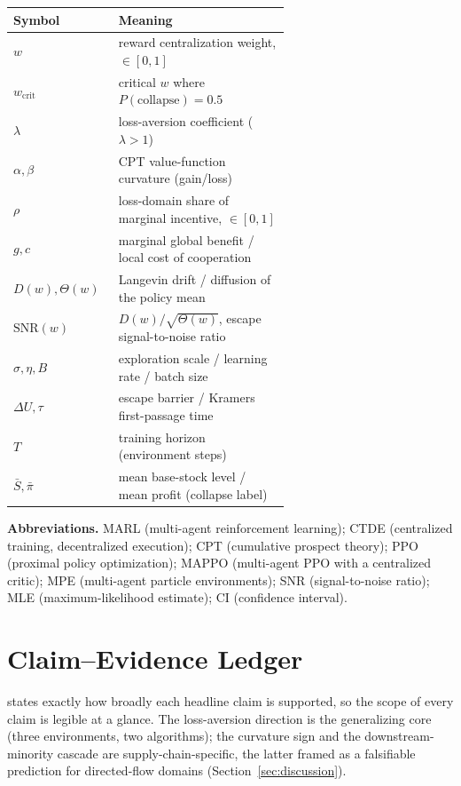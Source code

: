 \documentclass[letterpaper]{article}
\theoremstyle{plain}
\newcommand{\wcrit}{w_{\mathrm{crit}}}
\begin{document}
\begin{table}[h]
\centering
\small
\begin{tabular}{lp{0.62\linewidth}}
\toprule
Symbol & Meaning \\
\midrule
$w$ & reward centralization weight, $\in[0,1]$ \\
$\wcrit$ & critical $w$ where $P(\mathrm{collapse}){=}0.5$ \\
$\lambda$ & loss-aversion coefficient ($\lambda{>}1$) \\
$\alpha,\beta$ & CPT value-function curvature (gain/loss) \\
$\rho$ & loss-domain share of marginal incentive, $\in[0,1]$ \\
$g,c$ & marginal global benefit / local cost of cooperation \\
$D(w),\Theta(w)$ & Langevin drift / diffusion of the policy mean \\
$\mathrm{SNR}(w)$ & $D(w)/\sqrt{\Theta(w)}$, escape signal-to-noise ratio \\
$\sigma,\eta,B$ & exploration scale / learning rate / batch size \\
$\Delta U,\tau$ & escape barrier / Kramers first-passage time \\
$T$ & training horizon (environment steps) \\
$\bar S,\bar\pi$ & mean base-stock level / mean profit (collapse label) \\
\bottomrule
\end{tabular}
\end{table}

\noindent\textbf{Abbreviations.} MARL (multi-agent reinforcement learning);
CTDE (centralized training, decentralized execution); CPT (cumulative prospect
theory); PPO (proximal policy optimization); MAPPO (multi-agent PPO with a
centralized critic); MPE (multi-agent particle environments); SNR
(signal-to-noise ratio); MLE (maximum-likelihood estimate);
CI (confidence interval).

\section{Claim--Evidence Ledger}
\label{sec:appendix_ledger}
 states exactly how broadly each headline claim is
supported, so the scope of every claim is legible at a glance. The
loss-aversion direction is the generalizing core (three environments, two
algorithms); the curvature sign and the downstream-minority cascade are
supply-chain-specific, the latter framed as a falsifiable prediction for
directed-flow domains (Section~\ref{sec:discussion}).
\end{document}
